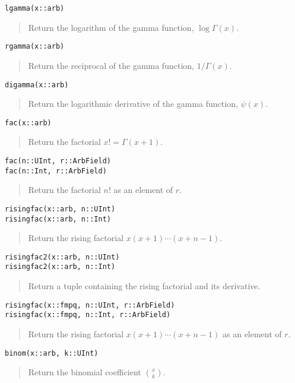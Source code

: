 \documentclass[a4paper,10pt]{article}
\newcommand{\desc}[1]{\vspace{-3mm}\begin{quote}#1\end{quote}}
\begin{document}
{{\begin{lstlisting}
lgamma(x::arb)
\end{lstlisting}

\desc{Return the logarithm of the gamma function, $\log \Gamma(x)$.}

\begin{lstlisting}
rgamma(x::arb)
\end{lstlisting}

\desc{Return the reciprocal of the gamma function, $1 / \Gamma(x)$.}

\begin{lstlisting}
digamma(x::arb)
\end{lstlisting}

\desc{Return the logarithmic derivative of the gamma function, $\psi(x)$.}

\begin{lstlisting}
fac(x::arb)
\end{lstlisting}

\desc{Return the factorial $x! = \Gamma(x+1)$.}

\begin{lstlisting}
fac(n::UInt, r::ArbField)
fac(n::Int, r::ArbField)
\end{lstlisting}

\desc{Return the factorial $n!$ as an element of $r$.}

\begin{lstlisting}
risingfac(x::arb, n::UInt)
risingfac(x::arb, n::Int)
\end{lstlisting}

\desc{Return the rising factorial $x (x+1) \cdots (x+n-1)$.}

\begin{lstlisting}
risingfac2(x::arb, n::UInt)
risingfac2(x::arb, n::Int)
\end{lstlisting}

\desc{Return a tuple containing the rising factorial and its derivative.}

\begin{lstlisting}
risingfac(x::fmpq, n::UInt, r::ArbField)
risingfac(x::fmpq, n::Int, r::ArbField)
\end{lstlisting}

\desc{Return the rising factorial $x (x+1) \cdots (x+n-1)$ as an element of $r$.}

\begin{lstlisting}
binom(x::arb, k::UInt)
\end{lstlisting}

\desc{Return the binomial coefficient ${x \choose k}$.}

}}
\end{document}
